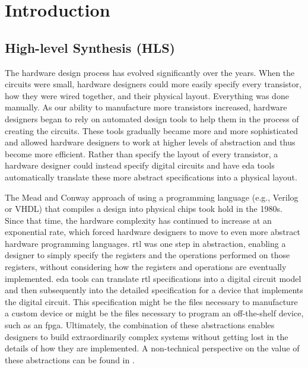 
\chapter{Introduction}
\glsresetall
\label{chapter:introduction}
\section{High-level Synthesis (HLS)}

The hardware design process has evolved significantly over the years. When the circuits were small, hardware designers could more easily specify every transistor, how they were wired together, and their physical layout. Everything was done manually. As our ability to manufacture more transistors increased, hardware designers began to rely on automated design tools to help them in the process of creating the circuits. These tools gradually became more and more sophisticated and allowed hardware designers to work at higher levels of abstraction and thus become more efficient. Rather than specify the layout of every transistor, a hardware designer could instead specify digital circuits and have \gls{eda} tools automatically translate these more abstract specifications into a physical layout. 

The Mead and Conway approach \cite{mead1980introduction} of using a programming language (e.g., Verilog or VHDL) that compiles a design into physical chips took hold in the 1980s. Since that time, the hardware complexity has continued to increase at an exponential rate, which forced hardware designers to move to even more abstract hardware programming languages. \gls{rtl} was one step in abstraction, enabling a designer to simply specify the registers and the operations performed on those registers, without considering how the registers and operations are eventually implemented. \gls{eda} tools can translate \gls{rtl} specifications into a digital circuit model and then subsequently into the detailed specification for a device that implements the digital circuit.  This specification might be the files necessary to manufacture a custom device or might be the files necessary to program an off-the-shelf device, such as an \gls{fpga}. Ultimately, the combination of these abstractions enables designers to build extraordinarily complex systems without getting lost in the details of how they are implemented.  A non-technical perspective on the value of these abstractions can be found in \cite{lee2017plato}.

